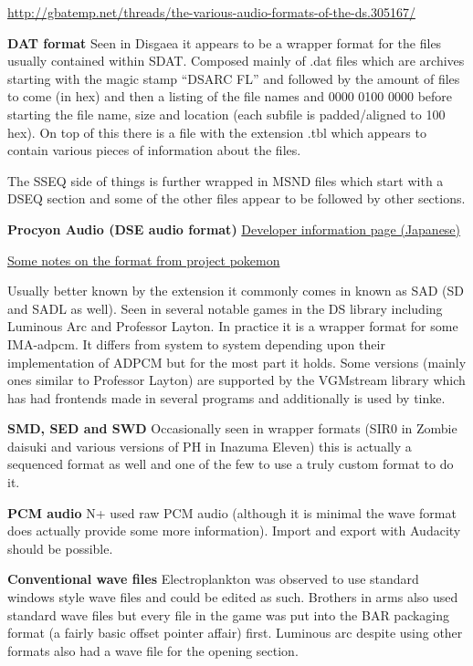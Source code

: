 \documentclass[
]{book}
\begin{document}
\url{http://gbatemp.net/threads/the-various-audio-formats-of-the-ds.305167/}

\textbf{DAT format} Seen in Disgaea it appears to be a wrapper format for the files usually contained within SDAT. Composed mainly of .dat files which are archives starting with the magic stamp ``DSARC FL'' and followed by the amount of files to come (in hex) and then a listing of the file names and 0000 0100 0000 before starting the file name, size and location (each subfile is padded/aligned to 100 hex). On top of this there is a file with the extension .tbl which appears to contain various pieces of information about the files.

The SSEQ side of things is further wrapped in MSND files which start with a DSEQ section and some of the other files appear to be followed by other sections.

\textbf{Procyon Audio (DSE audio format)} \href{http://www.procyon-studio.co.jp/dse/}{Developer information page (Japanese)}

\href{http://projectpokemon.org/wiki/Digital_Sound_Elements}{Some notes on the format from project pokemon}

Usually better known by the extension it commonly comes in known as SAD (SD and SADL as well). Seen in several notable games in the DS library including Luminous Arc and Professor Layton. In practice it is a wrapper format for some IMA-adpcm. It differs from system to system depending upon their implementation of ADPCM but for the most part it holds. Some versions (mainly ones similar to Professor Layton) are supported by the VGMstream library which has had frontends made in several programs and additionally is used by tinke.

\textbf{SMD, SED and SWD} Occasionally seen in wrapper formats (SIR0 in Zombie daisuki and various versions of PH in Inazuma Eleven) this is actually a sequenced format as well and one of the few to use a truly custom format to do it.

\textbf{PCM audio} N+ used raw PCM audio (although it is minimal the wave format does actually provide some more information). Import and export with Audacity should be possible.

\textbf{Conventional wave files} Electroplankton was observed to use standard windows style wave files and could be edited as such. Brothers in arms also used standard wave files but every file in the game was put into the BAR packaging format (a fairly basic offset pointer affair) first. Luminous arc despite using other formats also had a wave file for the opening section.
\end{document}
